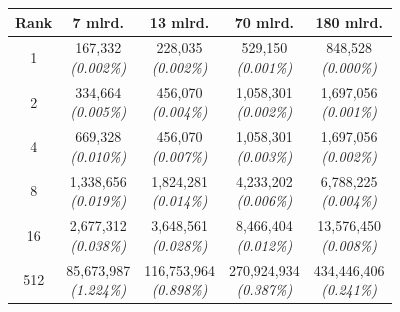 \documentclass[12pt,oneside]{memoir}
\begin{document}
\begin{table}[h!]
	\centering
	\setlength{\tabcolsep}{12pt}
	\renewcommand{\arraystretch}{3}
	\begin{tabular}{|c|c|c|c|c|} %
		\hline
		Rank & 7 mlrd. & 13 mlrd. & 70 mlrd. & 180 mlrd. \\
		\hline
		1 & \makecell{167,332 \\ \textit{(0.002\%)}} & \makecell{228,035 \\ \textit{(0.002\%)}} & \makecell{529,150 \\ \textit{(0.001\%)}} & \makecell{848,528 \\ \textit{(0.000\%)}} \\ 
		\hline
		2 & \makecell{334,664 \\ \textit{(0.005\%)}} & \makecell{456,070 \\ \textit{(0.004\%)}} & \makecell{1,058,301 \\ \textit{(0.002\%)}} & \makecell{1,697,056 \\ \textit{(0.001\%)}} \\ 
		\hline
		4 & \makecell{669,328 \\ \textit{(0.010\%)}} & \makecell{456,070 \\ \textit{(0.007\%)}} & \makecell{1,058,301 \\ \textit{(0.003\%)}} & \makecell{1,697,056 \\ \textit{(0.002\%)}} \\ 
		\hline
		8 & \makecell{1,338,656 \\ \textit{(0.019\%)}} & \makecell{1,824,281 \\ \textit{(0.014\%)}} & \makecell{4,233,202 \\ \textit{(0.006\%)}} & \makecell{6,788,225 \\ \textit{(0.004\%)}} \\ 
		\hline
		16 & \makecell{2,677,312 \\ \textit{(0.038\%)}} & \makecell{3,648,561 \\ \textit{(0.028\%)}} & \makecell{8,466,404 \\ \textit{(0.012\%)}} & \makecell{13,576,450 \\ \textit{(0.008\%)}} \\ 
		\hline
		512 & \makecell{85,673,987 \\ \textit{(1.224\%)}} & \makecell{116,753,964 \\ \textit{(0.898\%)}} & \makecell{270,924,934 \\ \textit{(0.387\%)}} & \makecell{434,446,406 \\ \textit{(0.241\%)}} \\ 

\end{tabular}
\end{table}
\end{document}
